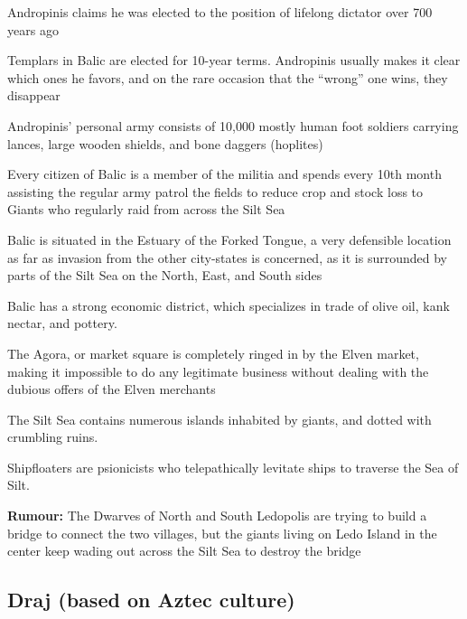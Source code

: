 \begin{description}
    \item Andropinis claims he was elected to the position of lifelong dictator over 700 years ago
    \item Templars in Balic are elected for 10-year terms. Andropinis usually makes it clear which ones he favors, and on the rare occasion that the “wrong” one wins, they disappear
    \item Andropinis’ personal army consists of 10,000 mostly human foot soldiers carrying lances, large wooden shields, and bone daggers (hoplites)
    \item Every citizen of Balic is a member of the militia and spends every 10th month assisting the regular army patrol the fields to reduce crop and stock loss to Giants who regularly raid from across the Silt Sea
    \item Balic is situated in the Estuary of the Forked Tongue, a very defensible location as far as invasion from the other city-states is concerned, as it is surrounded by parts of the Silt Sea on the North, East, and South sides
    \item Balic has a strong economic district, which specializes in trade of olive oil, kank nectar, and pottery.
    \item The Agora, or market square is completely ringed in by the Elven market, making it impossible to do any legitimate business without dealing with the dubious offers of the Elven merchants
    \item The Silt Sea contains numerous islands inhabited by giants, and dotted with crumbling ruins.
    \item Shipfloaters are psionicists who telepathically levitate ships to traverse the Sea of Silt.
    \item \textbf{Rumour:} The Dwarves of North and South Ledopolis are trying to build a bridge to connect the two villages, but the giants living on Ledo Island in the center keep wading out across the Silt Sea to destroy the bridge
\end{description}

\subsection{Draj (based on Aztec culture)}

